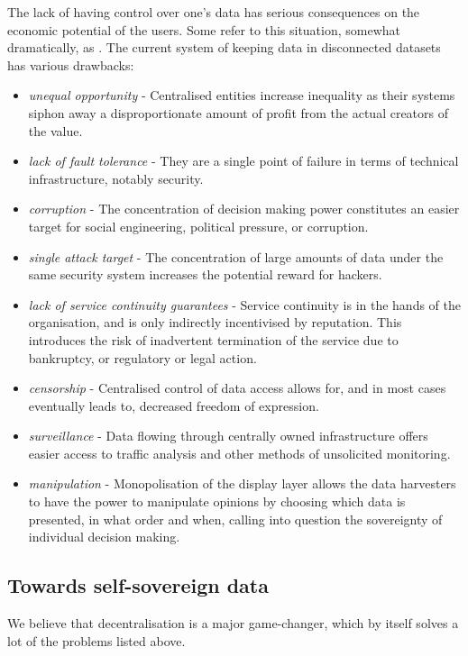 The lack of having control over one's data has serious consequences on the economic potential of the users. Some refer to this situation, somewhat dramatically, as . 
The current system of keeping data in disconnected datasets has various drawbacks: 

\begin{itemize}
    \item \emph{unequal opportunity} - Centralised entities increase inequality as their systems siphon away a disproportionate amount of profit from the actual creators of the value.
    \item \emph{lack of fault tolerance} - They are a single point of failure in terms of technical infrastructure, notably security.
    \item \emph{corruption} - The concentration of decision making power constitutes an easier target for social engineering, political pressure, or corruption.
    \item \emph{single attack target} - The concentration of large amounts of data under the same security system increases the potential reward for hackers. 
    \item \emph{lack of service continuity guarantees} - Service continuity is in the hands of the organisation, and is only indirectly incentivised by reputation. This introduces the risk of inadvertent termination of the service due to bankruptcy, or regulatory or legal action.
    \item \emph{censorship} - Centralised control of data access allows for, and in most cases eventually leads to, decreased freedom of expression.
    \item \emph{surveillance} - Data flowing through centrally owned infrastructure offers easier access to traffic analysis and other methods of unsolicited monitoring.
    \item \emph{manipulation} - Monopolisation of the display layer allows the data harvesters to have the power to manipulate opinions by choosing which data is presented, in what order and when, calling into question the sovereignty of individual decision making.
\end{itemize}


\subsection{Towards self-sovereign data \statusgreen} \label{sec:selfsovereigndata}

We believe that decentralisation is a major game-changer, which by itself solves a lot of the problems listed above.

